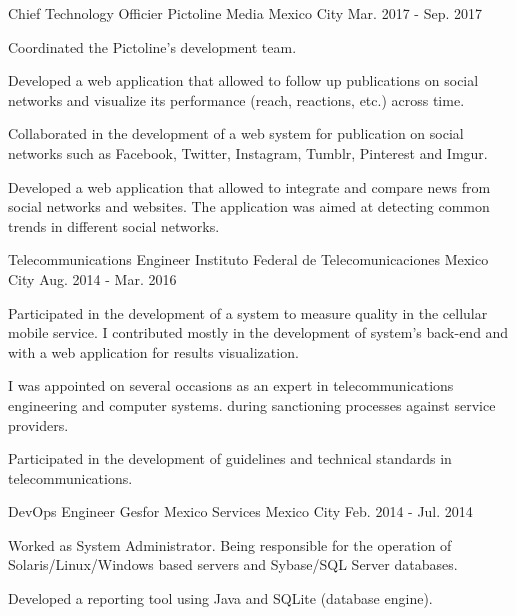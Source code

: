 \begin{cventries}
  \cventry
    {Chief Technology Officier} %
    {Pictoline Media} %
    {Mexico City} %
    {Mar. 2017 - Sep. 2017} %
    {
      \begin{cvitems} %
        \item Coordinated the Pictoline's  development team.
        \item Developed a web application that allowed to follow up publications on social networks and visualize its performance (reach, reactions, etc.) across time.  
        \item Collaborated in the development of a web system for publication on social networks such as Facebook, Twitter, Instagram, Tumblr, Pinterest and Imgur.
        \item Developed a web application that allowed to integrate and compare news from social networks and websites. The application was aimed at detecting common trends in different social networks.
      \end{cvitems}
    }

  \cventry
    {Telecommunications Engineer} %
    {Instituto Federal de Telecomunicaciones} %
    {Mexico City} %
    {Aug. 2014 - Mar. 2016} %
    {
      \begin{cvitems} %
        \item Participated in the development of a system to measure quality in the cellular mobile service. I contributed mostly in the development of system's back-end and with a web application for results visualization. 
        \item I was appointed on several occasions as an %
        expert in telecommunications engineering and computer systems.  during sanctioning processes against service providers. 
        \item Participated in the development of guidelines and technical standards in telecommunications.
      \end{cvitems}
    }

  \cventry
    {DevOps Engineer} %
    {Gesfor Mexico Services} %
    {Mexico City} %
    {Feb. 2014 - Jul. 2014} %
    {
      \begin{cvitems} %
        \item Worked as System Administrator. Being responsible for the operation of Solaris/Linux/Windows based servers and Sybase/SQL Server databases.
        \item Developed a reporting tool using Java and SQLite (database engine).
      \end{cvitems}
    }


\end{cventries}
